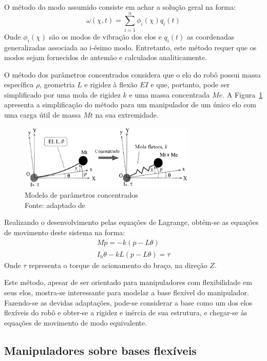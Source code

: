 O método do modo assumido consiste em achar a solução geral na forma:
%
\begin{equation}
	\omega (\chi ,t) = \sum_{i=1}^{n}\phi_i(\chi ) q_i(t)
\end{equation}
%
Onde $\phi_i(\chi)$ são os modos de vibração dos elos e $q_i(t)$ as coordenadas
generalizadas associada ao i-ésimo modo. Entretanto, este método requer que os
modos sejam fornecidos de antemão e calculados analiticamente.

O método dos parâmetros concentrados considera que o elo do robô possui massa
específica $\rho$, geometria $L$ e rigidez à flexão $EI$ e que, portanto, pode
ser simplificado por uma mola de rigidez $k$ e uma massa concentrada $Me$. A
Figura~\ref{fig::lumped} apresenta a simplificação do método para um manipulador
de um único elo com uma carga útil de massa $Mt$ na sua extremidade.

\begin{figure}[h]
	\centering 
 	\includegraphics[width=0.75\textwidth]{figs/lumped}
 	\caption[Modelo de parâmetros concentrados]{Modelo de parâmetros concentrados
 	\\ Fonte: adaptado de \cite{zhu1999simulation}}
 	\label{fig::lumped}
\end{figure}

Realizando o desenvolvimento pelas equações de Lagrange, obtém-se as equações de
movimento deste sistema na forma:
%
\begin{gather}
	M \ddot{p} = -k(p-L \theta) \\
	I_h \ddot{\theta} - k L(p-L \theta) = \tau
\end{gather}
%
Onde $\tau$ representa o torque de acionamento do braço, na direção $Z$.

Este método, apesar de ser orientado para manipuladores com flexibilidade em
seus elos, mostra-se interessante para modelar a base flexível do manipulador.
Fazendo-se as devidas adaptações, pode-se considerar a base como um dos elos
flexíveis do robô e obter-se a rigidez e inércia de sua estrutura, e chegar-se
às equações de movimento de modo equivalente.


\subsection{Manipuladores sobre bases flexíveis}

